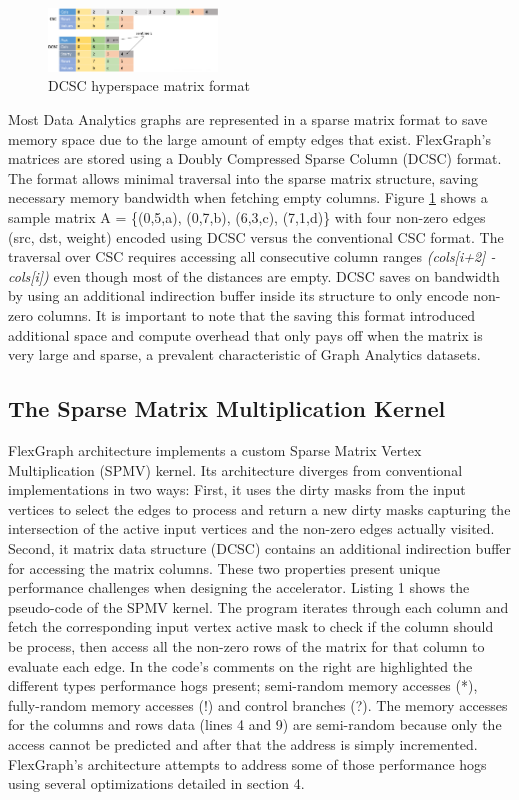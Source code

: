 \begin{figure}[htbp]
\centering
\includegraphics[width=0.4\textwidth]{figures/DCSC_matrix_format}
\caption{DCSC hyperspace matrix format}
\label{fig:DCSC_matrix_format}
\end{figure}

Most Data Analytics graphs are represented in a sparse matrix format to save memory space due to the large amount of empty edges that exist. FlexGraph's matrices are stored using a Doubly Compressed Sparse Column (DCSC) \cite{DCSC} format. The format allows minimal traversal into the sparse matrix structure, saving necessary memory bandwidth when fetching empty columns. Figure \ref{fig:DCSC_matrix_format} shows a sample matrix A = \{(0,5,a), (0,7,b), (6,3,c), (7,1,d)\} with four non-zero edges (src, dst, weight) encoded using DCSC versus the conventional CSC \cite{CSC} format. The traversal over CSC requires accessing all consecutive column ranges \textit{(cols[i+2] - cols[i])} even though most of the distances are empty. DCSC saves on bandwidth by using an additional indirection  buffer inside its structure to only encode non-zero columns. It is important to note that the saving this format introduced additional space and compute overhead that only pays off when the matrix is very large and sparse, a prevalent characteristic of Graph Analytics datasets.

\subsection{The Sparse Matrix Multiplication Kernel}

FlexGraph architecture implements a custom Sparse Matrix Vertex Multiplication (SPMV) kernel. Its architecture diverges from conventional implementations in two ways: First, it uses the dirty masks from  the input vertices to select the edges to process and return a new dirty masks capturing the intersection of the active input vertices and the non-zero edges actually visited. Second, it matrix data structure (DCSC) contains an additional indirection buffer for accessing the matrix columns. These two properties present unique performance challenges when designing the accelerator. Listing 1 shows the pseudo-code of the SPMV kernel. The program iterates through each column and fetch the corresponding input vertex active mask to check if the column should be process, then access all the non-zero rows of the matrix for that column to evaluate each edge. In the code's comments on the right are highlighted the different types performance hogs present; semi-random memory accesses (*), fully-random memory accesses (!) and control branches (?). The memory accesses for the columns and rows data (lines 4 and 9) are semi-random because only the access cannot be predicted and after that the address is simply incremented. FlexGraph's architecture attempts to address some of those performance hogs using several optimizations detailed in section 4.

